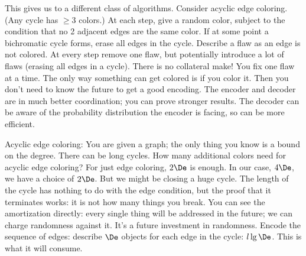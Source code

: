 This gives us to a different class of algorithms. %
Consider acyclic edge coloring. (Any cycle has $\ge 3$ colors.) At each step, give a random color, subject to the condition that no 2 adjacent edges are the same color. If at some point a bichromatic cycle forms, erase all edges in the cycle. Describe a flaw as an edge is not colored. At every step remove one flaw, but potentially introduce a lot of flaws (erasing all edges in a cycle). There is no collateral make! You fix one flaw at a time. The only way something can get colored is if you color it. Then you don't need to know the future to get a good encoding. The encoder and decoder are in much better coordination; you can prove stronger results. The decoder can be aware of the probability distribution the encoder is facing, so can be more efficient.


Acyclic edge coloring: You are given a graph; the only thing you know is a bound on the degree. There can be long cycles.
How many additional colors need for acyclic edge coloring? For just edge coloring, $2\De$ is enough. In our case, $4\De$, we have a choice of $2\De$.  But we might be closing a huge cycle. The length of the cycle has nothing to do with the edge condition, but the proof that it terminates works: it is not how many things you break. You can see the amortization directly: every single thing will be addressed in the future; we can charge randomness against it. It's a future investment in randomness. 
Encode the sequence of edges: describe $\De$ objects for each edge in the cycle: $l\lg\De$. This is what it will consume. %

